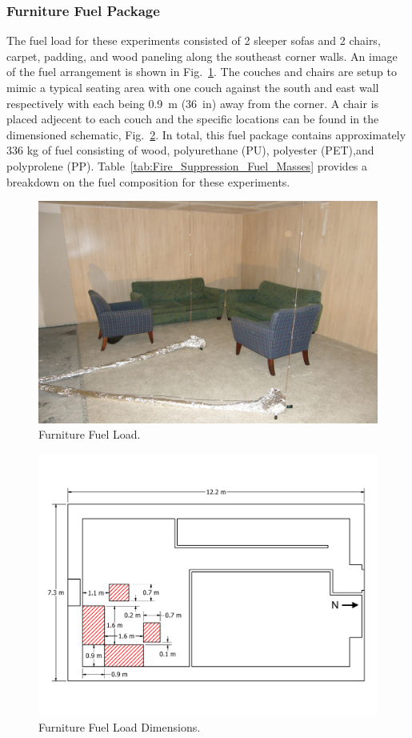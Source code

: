 \documentclass[12pt,oneside]{book}
\begin{document}
\subsubsection{Furniture Fuel Package}
\label{sec:fire_suppression_furniture_fuel}

The fuel load for these experiments consisted of 2 sleeper sofas and 2 chairs, carpet, padding, and wood paneling along the southeast corner walls. An image of the fuel arrangement is shown in Fig.~\ref{fig:Furniture_Fuel_Load}. The couches and chairs are setup to mimic a typical seating area with one couch against the south and east wall respectively with each being 0.9~m (36~in) away from the corner. A chair is placed adjecent to each couch and the specific locations can be found in the dimensioned schematic, Fig.~\ref{fig:Furniture_Fuel_Load_Dimensions}. In total, this fuel package contains approximately 336 kg of fuel consisting of wood, polyurethane (PU), polyester (PET),and polyprolene (PP). Table~\ref{tab:Fire_Suppression_Fuel_Masses} provides a breakdown on the fuel composition for these experiments.

\begin{figure}[!ht]
	\includegraphics[width=.8\columnwidth]{../Figures/Pictures/Furniture_Fuel_Load}
	\caption{Furniture Fuel Load.}
	\label{fig:Furniture_Fuel_Load}
\end{figure}

\begin{figure}[!ht]
	\includegraphics[width=.8\columnwidth]{../Figures/Floor_Plans/PDFs/East_Structure/DelCo_2012_East_Structure_Furniture}
	\caption{Furniture Fuel Load Dimensions.}
	\label{fig:Furniture_Fuel_Load_Dimensions}
\end{figure}
\end{document}
